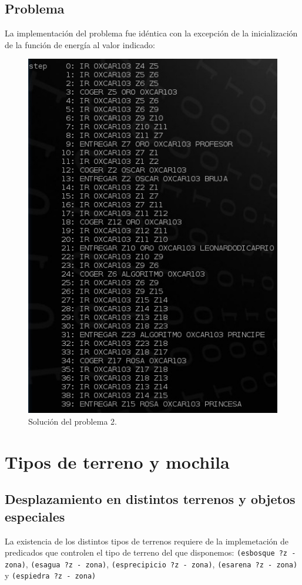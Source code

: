 \documentclass[a4paper, 11pt]{article}
\begin{document}
	\subsection{Problema}
		La implementación del problema fue idéntica con la excepción de la inicialización de la función de
		energía al valor indicado:
		\begin{figure}[H]
			\centering
			\includegraphics[width=15cm]{Problema2.jpg}
			\caption{Solución del problema 2.}
			\label{Prob-2}
		\end{figure}

\section{Tipos de terreno y mochila}
	\subsection{Desplazamiento en distintos terrenos y objetos especiales}
		La existencia de los distintos tipos de terrenos requiere de la implemetación de predicados que
		controlen el tipo de terreno del que disponemos: \verb|(esbosque ?z - zona)|, \verb|(esagua ?z - zona)|,
		\verb|(esprecipicio ?z - zona)|, \verb|(esarena ?z - zona)| y \verb|(espiedra ?z - zona)|
		
\end{document}
